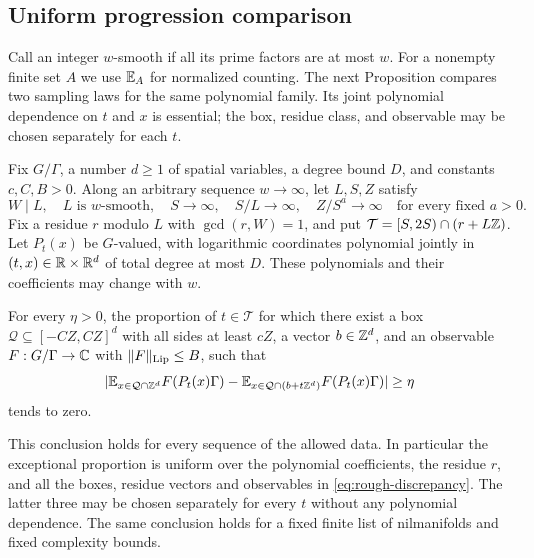 \subsection{Uniform progression comparison}

Call an integer $w$-smooth if all its prime factors are at most $w$.
For a nonempty finite set $A$ we use $\mathbb E_A$ for normalized counting.
The next Proposition compares two sampling laws for the same polynomial
family.  Its joint polynomial dependence on $t$ and $x$ is essential;
the box, residue class, and observable may be chosen separately for
each $t$.

\begin{proposition}
\label{prop:rough-step}
Fix $G/\Gamma$, a number $d\geq1$ of spatial variables, a degree bound
$D$, and constants $c,C,B>0$.  Along an arbitrary sequence $w\to\infty$,
let $L,S,Z$ satisfy
\begin{equation}
 W\mid L,\quad L\text{ is }w\text{-smooth},\quad
 S\to\infty,\quad S/L\to\infty,\quad
 Z/S^a\to\infty\quad\text{for every fixed }a>0.
 \label{eq:rough-scales}
\end{equation}
Fix a residue $r$ modulo $L$ with $\gcd(r,W)=1$, and put
$\mathcal T=[S,2S)\cap(r+L\mathbb Z)$.
Let $P_t(x)$ be $G$-valued, with logarithmic coordinates polynomial
jointly in $(t,x)\in\mathbb R\times\mathbb R^d$ of total degree at most $D$.
These polynomials and their coefficients may change with $w$.

For every $\eta>0$, the proportion of $t\in\mathcal T$ for which
there exist a box $\mathcal Q\subseteq[-CZ,CZ]^d$ with all sides at
least $cZ$, a vector $b\in\mathbb Z^d$, and an observable
$F:G/\Gamma\to\mathbb C$ with $\lVert F\rVert_{\operatorname{Lip}}\leq B$, such that
\begin{equation}
 \lvert\mathbb E_{x\in\mathcal Q\cap\mathbb Z^d}F(P_t(x)\Gamma)
       -\mathbb E_{x\in\mathcal Q\cap(b+t\mathbb Z^d)}F(P_t(x)\Gamma)\rvert
       \geq\eta
 \label{eq:rough-discrepancy}
\end{equation}
tends to zero.

This conclusion holds for every sequence of the allowed data.
In particular the exceptional proportion is uniform over the
polynomial coefficients, the residue $r$, and all the boxes, residue
vectors and observables in \eqref{eq:rough-discrepancy}.  The latter
three may be chosen separately for every $t$ without any polynomial
dependence.  The same conclusion holds for a fixed finite list of
nilmanifolds and fixed complexity bounds.
\end{proposition}

